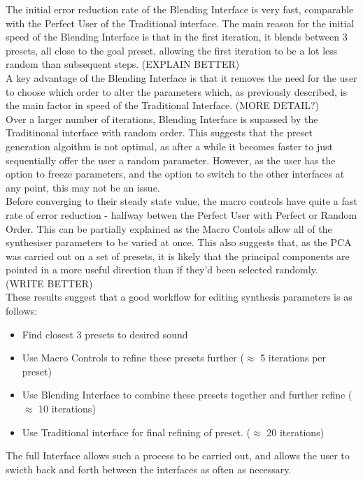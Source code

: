 \documentclass[11pt, oneside]{report}   	%
\begin{document}
The initial error reduction rate of the Blending Interface is very fast, comparable with the Perfect User of the Traditional interface. The main reason for the initial speed of the Blending Interface is that in the first iteration, it blends between 3 presets, all close to the goal preset, allowing the first iteration to be a lot less random than subsequent steps. (EXPLAIN BETTER)\\
A key advantage of the Blending Interface is that it removes the need for the user to choose which order to alter the parameters which, as previously described, is the main factor in speed of the Traditional Interface. (MORE DETAIL?)\\
 Over a larger number of iterations, Blending Interface is supassed by the Traditinonal interface with random order. This suggests that the preset generation algoithm is not optimal, as after a while it becomes faster to just sequentially offer the user a random parameter. However, as the user has the option to freeze parameters, and the option to switch to the other interfaces at any point, this may not be an issue. \\
Before converging to their steady state value, the macro controls have quite a fast rate of error reduction - halfway betwen the Perfect User with Perfect or Random Order. This can be partially explained as the Macro Contols allow all of the synthesiser parameters to be varied at once. This also suggests that, as the PCA was carried out on a set of presets, it is likely that the principal components are pointed in a more useful direction than if they'd been selected randomly. (WRITE BETTER)\\
These results suggest that a good workflow for editing synthesis parameters is as follows:
\vspace{-3em}
\begin{itemize}
	\setlength\itemsep{-1.2em}
	\item Find closest 3 presets to desired sound
	\item Use Macro Controls to refine these presets further ($\approx$ 5 iterations per preset)
	\item Use Blending Interface to combine these presets together and further refine ($\approx$ 10 iterations)
	\item Use Traditional interface for final refining of preset. ($\approx$ 20 iterations)
\end{itemize}
\vspace{-0.5em}
The full Interface allows such a process to be carried out, and allows the user to swicth back and forth between the interfaces as often as necessary.
\end{document}
